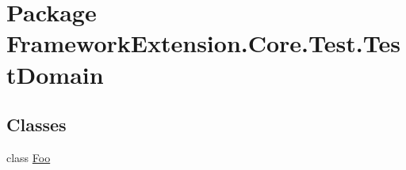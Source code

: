 \hypertarget{namespace_framework_extension_1_1_core_1_1_test_1_1_test_domain}{\section{Package Framework\-Extension.\-Core.\-Test.\-Test\-Domain}
\label{namespace_framework_extension_1_1_core_1_1_test_1_1_test_domain}
}
\subsection*{Classes}
\begin{DoxyCompactItemize}
\item 
class \hyperlink{class_framework_extension_1_1_core_1_1_test_1_1_test_domain_1_1_foo}{Foo}
\end{DoxyCompactItemize}

